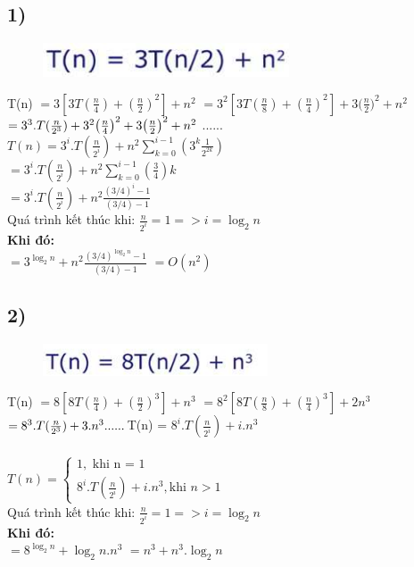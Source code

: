 \documentclass[10pt,a4paper]{article}
\begin{document}
\subsection*{1)}
\begin{figure}[H]
    \centering
    \includegraphics[scale=.7]{images/3,1.png}
    \label{fig:my_label}
\end{figure}
T(n) 
$=3[3T(\frac{n}{4}) + (\frac{n}{2})^2] + n^2$ $=3^2[3T(\frac{n}{8}) + (\frac{n}{4})^2] + 3\big(\frac{n}{2}\big)^2+n^2$ 
$= 3^3.T(\frac{n}{2^3}) +3^2\big(\frac{n}{4}\big)^2+3\big(\frac{n}{2}\big)^2+n^2\\$
......\\
$T(n) = 3^i.T(\frac{n}{2^i})+n^2\sum_{k=0}^{i-1}(3^k\frac{1}{2^{2k}})$  \\
$ = 3^i.T(\frac{n}{2^i})+n^2\sum_{k=0}^{i-1}(\frac{3}{4})k$  \\
$ = 3^i.T(\frac{n}{2^i})+n^2\frac{(3/4)^i-1}{(3/4)-1}$  \\

Quá trình kết thúc khi: $\frac{n}{2^i} = 1 => i = \log_{2}n$ \\
\textbf{Khi đó:}
\\
$= 3^{\log_{2}n}+n^2\frac{(3/4)^{\log_{2}n} -1}{(3/4)-1}$ 
$= O(n^2)$ 
\subsection*{2)}
\begin{figure}[H]
    \centering
    \includegraphics[scale=.7]{images/32.png}
    \label{fig:my_label}
\end{figure}
T(n) 
$=8[8T(\frac{n}{4}) + (\frac{n}{2})^3] + n^3$ $=8^2[8T(\frac{n}{8}) + (\frac{n}{4})^3] + 2n^3$ $= 8^3.T(\frac{n}{2^3}) + 3.n^3\\
......\\
$T(n) = $8^i.T(\frac{n}{2^i})+i.n^3$ \\ \\
$
T(n) = 
    \begin{cases}
        1, \text{ khi n = 1} \\
        8^i.T(\frac{n}{2^i})+i.n^3 , \text{khi $n>1$}
    \end{cases}
$
\\
Quá trình kết thúc khi: $\frac{n}{2^i} = 1 => i = \log_{2}n$ \\
\textbf{Khi đó:}
\\
$= 8^{\log_{2}n}+{\log_{2}n}.n^3$ 
$= n^3 + n^3.{\log_{2}n}$ 
\end{document}
